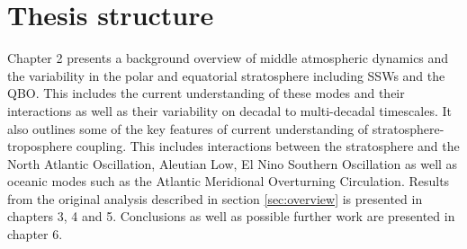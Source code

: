 \section{Thesis structure}
Chapter 2 presents a background overview of middle atmospheric dynamics and the variability in the polar and equatorial stratosphere including SSWs and the QBO. This includes the current understanding of these modes and their interactions as well as their variability on decadal to multi-decadal timescales. It also outlines some of the key features of current understanding of stratosphere-troposphere coupling. This includes interactions between the stratosphere and the North Atlantic Oscillation, Aleutian Low, El Nino Southern Oscillation as well as oceanic modes such as the Atlantic Meridional Overturning Circulation. Results from the original analysis described in section \ref{sec:overview} is presented in chapters 3, 4 and 5. Conclusions as well as possible further work are presented in chapter 6.








